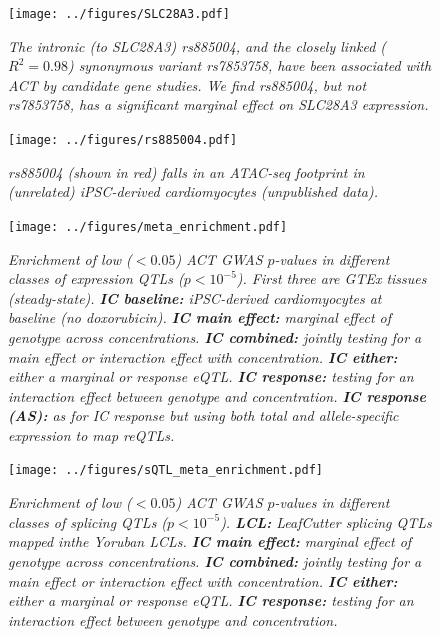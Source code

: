\documentclass{article}
\begin{document}
\begin{figure}[h]
\begin{center}
    \texttt{[image: ../figures/SLC28A3.pdf]} %
    \caption{\it{The intronic (to SLC28A3) rs885004, and the closely linked ($R^2=0.98$) synonymous variant rs7853758, have been associated with ACT by candidate gene studies\cite{Visscher2012-xl,Visscher2013-zs}. We find rs885004, but not rs7853758, has a significant marginal effect on SLC28A3 expression.}}
    \label{fig:SLC28A3}
    \end{center}
\end{figure}

\begin{figure}[h]
\begin{center}
    \texttt{[image: ../figures/rs885004.pdf]} %
    \caption{\it{rs885004 (shown in red) falls in an ATAC-seq footprint in (unrelated) iPSC-derived cardiomyocytes (unpublished data).}}
    \label{fig:rs885004}
    \end{center}
\end{figure}

\begin{figure}[h]
\begin{center}
    \texttt{[image: ../figures/meta\_enrichment.pdf]} 
    \caption{\it{Enrichment of low ($<0.05$) ACT GWAS $p$-values in different classes of expression QTLs ($p < 10^{-5}$). First three are GTEx tissues (steady-state). \textbf{IC baseline:} iPSC-derived cardiomyocytes at baseline (no doxorubicin). \textbf{IC main effect:} marginal effect of genotype across concentrations. \textbf{IC combined:} jointly testing for a main effect or interaction effect with concentration. \textbf{IC either:} either a marginal or response eQTL. \textbf{IC response:} testing for an interaction effect between genotype and concentration. \textbf{IC response (AS):} as for IC response but using both total and allele-specific expression to map reQTLs.}}
    \label{fig:meta_enrichment}
    \end{center}
\end{figure}

\begin{figure}[h]
\begin{center}
    \texttt{[image: ../figures/sQTL\_meta\_enrichment.pdf]} 
    \caption{\it{Enrichment of low ($<0.05$) ACT GWAS $p$-values in different classes of splicing QTLs ($p < 10^{-5}$). \textbf{LCL:} LeafCutter splicing QTLs mapped inthe Yoruban LCLs\cite{li2016rna}. \textbf{IC main effect:} marginal effect of genotype across concentrations. \textbf{IC combined:} jointly testing for a main effect or interaction effect with concentration. \textbf{IC either:} either a marginal or response eQTL. \textbf{IC response:} testing for an interaction effect between genotype and concentration.}}
    \label{fig:sQTL_meta_enrichment}
    \end{center}
\end{figure}
\end{document}
